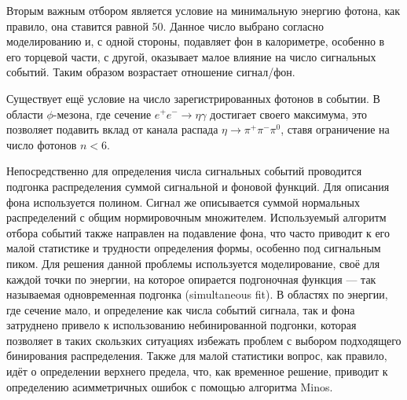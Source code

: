 Вторым важным отбором является условие на минимальную энергию фотона,
как правило, она ставится равной \SI{50}{\MeVr}.
Данное число выбрано согласно моделированию и,
с одной стороны, подавляет фон в калориметре,
особенно в его торцевой части, с другой,
оказывает малое влияние на число сигнальных событий.
Таким образом возрастает отношение сигнал/фон.

Существует ещё условие на число зарегистрированных фотонов в событии.
В области $\phi$-мезона,
где сечение $e^+ e^- \to \eta \gamma$ достигает своего максимума,
это позволяет подавить вклад от канала распада $\eta \to \pi^+\pi^-\pi^0$,
ставя ограничение на число фотонов $n < 6$.

Непосредственно для определения числа сигнальных событий проводится подгонка распределения суммой сигнальной и фоновой функций. Для описания фона используется полином. Сигнал же описывается суммой нормальных распределений с общим нормировочным множителем. Используемый алгоритм отбора событий также направлен на подавление фона, что часто приводит к его малой статистике и трудности определения формы, особенно под сигнальным пиком. Для решения данной проблемы используется моделирование, своё для каждой точки по энергии, на которое опирается подгоночная функция --- так называемая одновременная подгонка (simultaneous fit). В областях по энергии, где сечение мало, и определение как числа событий сигнала, так и фона затруднено привело к использованию небинированной подгонки, которая позволяет в таких скользких ситуациях избежать проблем с выбором подходящего бинирования распределения. Также для малой статистики вопрос, как правило, идёт о определении верхнего предела, что, как временное решение, приводит к определению асимметричных ошибок с помощью алгоритма Minos.